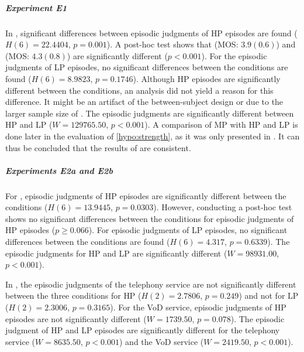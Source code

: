 \subparagraph*{Experiment E1}
In , significant differences between episodic judgments of \ac{HP} episodes are found ($H(6)=22.4404$, $p=0.001$).
A post-hoc test shows that \CIIa{} (\ac{MOS}: $3.9 (0.6)$) and  (\ac{MOS}: $4.3 (0.8)$) are significantly different ($p<0.001$).
For the episodic judgments of \ac{LP} episodes, no significant differences between the conditions are found ($H(6)=8.9823$, $p=0.1746$).
Although \ac{HP} episodes are significantly different between the conditions, an analysis did not yield a reason for this difference.
It might be an artifact of the between-subject design or due to the larger sample size of .
The episodic judgments are significantly different between \ac{HP} and \ac{LP} ($W=129765.50$, $p<0.001$).
A comparison of \ac{MP} with \ac{HP} and \ac{LP} is done later in the evaluation of \autoref{hypo:strength}, as it was only presented in .
It can thus be concluded that the results of  are consistent.

\subparagraph*{Experiments E2a and E2b}
For \EIIa{}, episodic judgments of \ac{HP} episodes are significantly different between the conditions ($H(6)=13.9445$, $p=0.0303$).
However, conducting a post-hoc test shows no significant differences between the conditions for episodic judgments of \ac{HP} episodes (${p \geq 0.066}$).
For episodic judgments of \ac{LP} episodes, no significant differences between the conditions are found ($H(6)=4.317$, $p=0.6339$).
The episodic judgments for \ac{HP} and \ac{LP} are significantly different ($W=98931.00$, $p<0.001$).

In \EIIb{}, the episodic judgments of the telephony service are not significantly different between the three conditions for \ac{HP} ($H(2)=2.7806$, $p=0.249$) and not for \ac{LP} ($H(2)=2.3006$, $p=0.3165$).
For the \ac{VoD} service, episodic judgments of \ac{HP} episodes are not significantly different ($W=1739.50$, $p=0.078$).
The episodic judgment of \ac{HP} and \ac{LP} episodes are significantly different for the telephony service ($W=8635.50$, $p<0.001$) and the \ac{VoD} service ($W=2419.50$, $p<0.001$).

